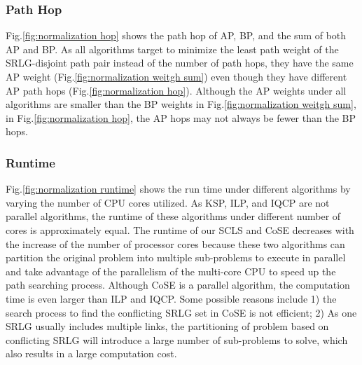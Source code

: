 \subsubsection{Path Hop}
Fig.\ref{fig:normalization hop} shows the path hop of AP, BP, and the sum of both AP and BP. As all algorithms target to minimize the least path weight of the SRLG-disjoint path pair instead of the number of path hops, they have the same AP weight (Fig.\ref{fig:normalization weitgh sum}) even though they have different AP path hops (Fig.\ref{fig:normalization hop}). Although the AP weights under all algorithms are smaller than the BP weights in Fig.\ref{fig:normalization weitgh sum}, in Fig.\ref{fig:normalization hop}, the AP hops may not always be fewer than the BP hops.


\subsubsection{Runtime}
\label{subsubsec:Runtime}
Fig.\ref{fig:normalization runtime} shows the run time under different algorithms by varying the number of CPU cores utilized.
As KSP, ILP, and IQCP are not parallel algorithms, the runtime of these algorithms under different number of cores is approximately equal. The runtime of our SCLS  and CoSE decreases with the increase of the number of processor cores because these two algorithms can partition the original problem into multiple sub-problems to execute in parallel and take advantage of the parallelism of the multi-core CPU to speed up the path searching process. Although CoSE is a parallel algorithm, the computation time is even larger than  ILP and IQCP. Some possible reasons include 1) the search process to find the conflicting SRLG set in CoSE  is not efficient; 2) As one SRLG usually includes multiple links, the partitioning of problem based on conflicting SRLG will introduce a large number of sub-problems to solve, which also results in a large computation cost.


